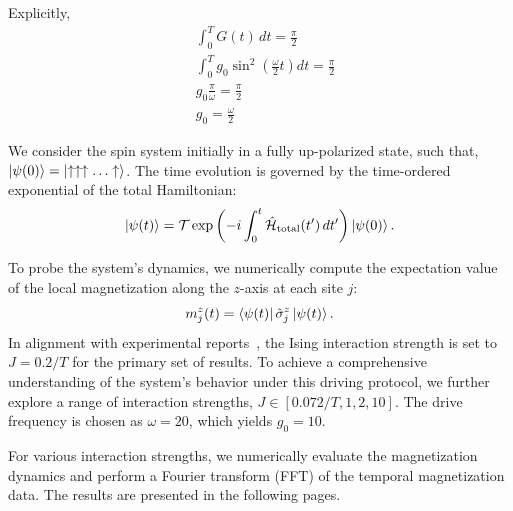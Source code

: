 \documentclass[a4paper, 11pt]{article}
\begin{document}
Explicitly,
\begin{align*}
    &\int_0^T G(t)\,dt = \frac{\pi}{2} \\
    &\int_0^T g_0\sin^2\left(\frac{\omega}{2}t \right) dt = \frac{\pi}{2}\\
    &g_0 \frac{\pi}{\omega} = \frac{\pi}{2}\\
    &\boxed{g_0 = \frac{\omega}{2}}
\end{align*}
 



We consider the spin system initially in a fully up-polarized state, such that, $\displaystyle\ket{\psi(0)} = \ket{\uparrow\uparrow\uparrow\ldots\uparrow}$. The time evolution is governed by the time-ordered exponential of the total Hamiltonian:
\begin{equation}
    \ket{\psi(t)} = \mathcal{T} \exp\left(-i\int_0^t \hat{\mathcal{H}}_{\text{total}}(t')\,dt'\right) \ket{\psi(0)}.
\end{equation}

To probe the system's dynamics, we numerically compute the expectation value of the local magnetization along the $z$-axis at each site $j$:
\begin{equation}
    m_j^z(t) = \bra{\psi(t)} \hat{\sigma}_j^z \ket{\psi(t)}.
\end{equation}  
In alignment with experimental reports~\cite{Zhang2017}, the Ising interaction strength is set to $J = 0.2/T$ for the primary set of results. To achieve a comprehensive understanding of the system's behavior under this driving protocol, we further explore a range of interaction strengths, $J \in [0.072/T, 1, 2, 10]$. The drive frequency is chosen as $\omega = 20$, which yields $g_0 = 10$.

For various interaction strengths, we numerically evaluate the magnetization dynamics and perform a Fourier transform (FFT) of the temporal magnetization data. The results are presented in the following pages.

\newpage
\end{document}
